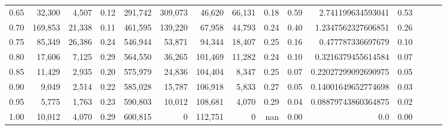 \begin{tabular}{rrrrrrrrrrrrrrr}
0.65 &   32,300 &   4,507 &  0.12 &  291,742 &  309,073 &   46,620 &   66,131 &  0.18 &  0.59 &    2.741199634593041 &      0.53 \\
0.70 &  169,853 &  21,338 &  0.11 &  461,595 &  139,220 &   67,958 &   44,793 &  0.24 &  0.40 &   1.2347562327606851 &      0.26 \\
0.75 &   85,349 &  26,386 &  0.24 &  546,944 &   53,871 &   94,344 &   18,407 &  0.25 &  0.16 &    0.477787336697679 &      0.10 \\
0.80 &   17,606 &   7,125 &  0.29 &  564,550 &   36,265 &  101,469 &   11,282 &  0.24 &  0.10 &   0.3216379455614584 &      0.07 \\
0.85 &   11,429 &   2,935 &  0.20 &  575,979 &   24,836 &  104,404 &    8,347 &  0.25 &  0.07 &  0.22027299092690975 &      0.05 \\
0.90 &    9,049 &   2,514 &  0.22 &  585,028 &   15,787 &  106,918 &    5,833 &  0.27 &  0.05 &  0.14001649652774698 &      0.03 \\
0.95 &    5,775 &   1,763 &  0.23 &  590,803 &   10,012 &  108,681 &    4,070 &  0.29 &  0.04 &  0.08879743860364875 &      0.02 \\
1.00 &   10,012 &   4,070 &  0.29 &  600,815 &        0 &  112,751 &        0 &   nan &  0.00 &                  0.0 &      0.00 \\
\bottomrule
\end{tabular}
